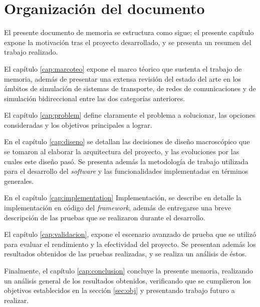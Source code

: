 \section{Organización del documento}

El presente documento de memoria se estructura como sigue; el presente capítulo expone la motivación tras el proyecto desarrollado, y se presenta un resumen del trabajo realizado.

El capítulo \ref{cap:marcoteo} expone el marco téorico que sustenta el trabajo de memoria, además de presentar una extensa revisión del estado del arte en los ámbitos de simulación de sistemas de transporte, de redes de comunicaciones y de simulación bidireccional entre las dos categorías anteriores.

El capítulo \ref{cap:problem} define claramente el problema a solucionar, las opciones consideradas y los objetivos principales a lograr.

En el capítulo \ref{cap:diseno} se detallan las decisiones de diseño macroscópico que se tomaron al elaborar la arquitectura del proyecto, y las evoluciones por las cuales este diseño pasó. Se presenta además la metodología de trabajo utilizada para el desarrollo del \emph{software} y las funcionalidades implementadas en términos generales.

En el capítulo \ref{cap:implementation} Implementación, se describe en detalle la implementación en código del \emph{framework}, además de entregarse una breve descripción de las pruebas que se realizaron durante el desarrollo.

El capítulo \ref{cap:validacion}, expone el escenario avanzado de prueba que se utilizó para evaluar el rendimiento y la efectividad del proyecto. Se presentan además los resultados obtenidos de las pruebas realizadas, y se realiza un análisis de éstos.

Finalmente, el capítulo \ref{cap:conclusion} concluye la presente memoria, realizando un análisis general de los resultados obtenidos, verificando que se cumplieron los objetivos establecidos en la sección \ref{sec:obj} y presentando trabajo futuro a realizar.

